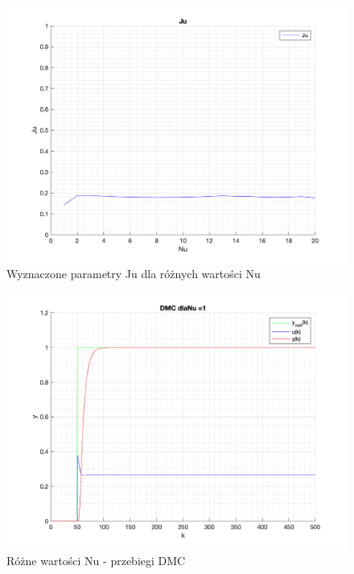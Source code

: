 \documentclass[a4paper, 11pt]{article}
\begin{document}
\begin{enumerate}
 \begin{figure} [H]
\centering
 \includegraphics[width=\linewidth]{./ModelsP4_J/JuNu.png} 
 \caption[Wyznaczone parametry Ju dla różnych wartości Nu]
{Wyznaczone parametry Ju dla różnych wartości Nu}
 \end{figure}

\begin{figure} [H]
\centering
 \includegraphics[width=\linewidth]{./ModelsP4_Nu/P4_DMC_Nu_1_png.png} 
 \caption[Różne wartości Nu - przebiegi DMC]
{Różne wartości Nu - przebiegi DMC}
 \end{figure}
 

\end{enumerate}
\end{document}
